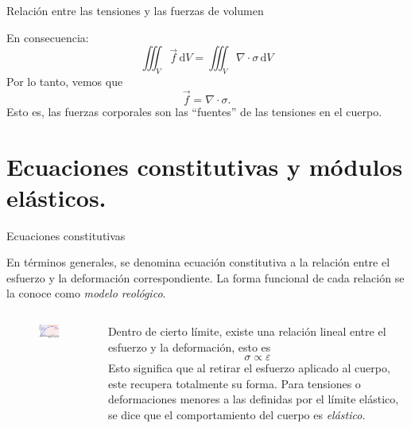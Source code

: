 \documentclass[11pt,handout,aspectratio=1610]{beamer}
\newcommand{\diff}[0]{\text{d}}
\newcommand{\vs}{\vspace{11pt}}
\begin{document}
\begin{frame}{Relación entre las tensiones y las fuerzas de volumen}
    
    En consecuencia: $$  \iiint_V \vec{f} \, \diff V = \iiint_V \nabla \cdot \sigma \, \diff V $$ Por lo tanto, vemos que $$ \vec{f} = \nabla \cdot \sigma. $$ Esto es, las fuerzas corporales son las ``fuentes'' de las tensiones en el cuerpo.

\end{frame}

\section{Ecuaciones constitutivas y módulos elásticos.}

\begin{frame}{Ecuaciones constitutivas}

    En términos generales, se denomina ecuación constitutiva a la relación entre el esfuerzo y la deformación correspondiente. La forma funcional de cada relación se la conoce como \emph{modelo reológico}.

    \vs 

    \begin{columns}
        \begin{column}{0.4\textwidth}
            \begin{figure}
                \centering
                \includegraphics[width=\textwidth]{../figs/mechanics_stress-10.pdf}
            \end{figure}            
        \end{column}
        \begin{column}{0.6\textwidth}
            Dentro de cierto límite, existe una relación lineal entre el esfuerzo y la deformación, esto es $$ \sigma \propto \varepsilon $$ Esto significa que al retirar el esfuerzo aplicado al cuerpo, este recupera totalmente su forma. Para tensiones o deformaciones menores a las definidas por el límite elástico, se dice que el comportamiento del cuerpo es \emph{elástico}.
        \end{column}
    \end{columns}


\end{frame}
\end{document}

